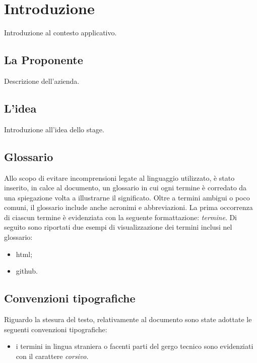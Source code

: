 \chapter{Introduzione}
\label{cap:introduzione}

\par Introduzione al contesto applicativo.

\section{La Proponente}

\par Descrizione dell'azienda.

\section{L'idea}

\par Introduzione all'idea dello stage.

\section{Glossario}

\par Allo scopo di evitare incomprensioni legate al linguaggio utilizzato, è stato inserito, in calce al documento, un glossario in cui ogni termine è corredato da una spiegazione volta a illustrarne il significato. Oltre a termini ambigui o poco comuni, il glossario include anche acronimi e abbreviazioni. La prima occorrenza di ciascun termine è evidenziata con la seguente formattazione: \emph{termine}\glsfirstoccur. Di seguito sono riportati due esempi di visualizzazione dei termini inclusi nel glossario:

\begin{itemize}
    \item \gls{html};
    \item \gls{github}.
\end{itemize}

\section{Convenzioni tipografiche}

\par Riguardo la stesura del testo, relativamente al documento sono state adottate le seguenti convenzioni tipografiche:
\begin{itemize}
	\item i termini in lingua straniera o facenti parti del gergo tecnico sono evidenziati con il carattere \emph{corsivo}.
\end{itemize}
